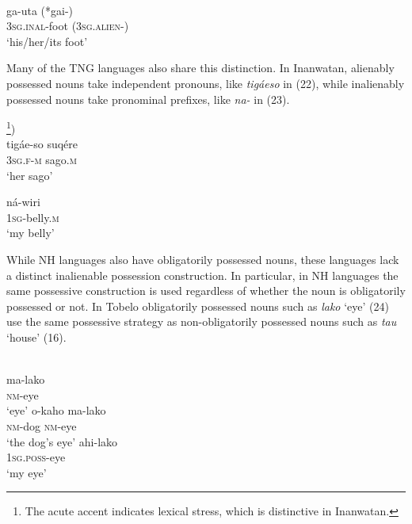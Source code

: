 \ea%
 \\
\gll  ga-uta  (*gai-) \\
  \textsc{3sg.inal}-foot  \textsc{(3sg.alien-)} \\
\glt `his/her/its foot'
\z
 
Many of the TNG languages also share this distinction. In Inanwatan, alienably possessed nouns take independent pronouns, like \textit{tig\'aeso} in (22), while inalienably possessed nouns take pronominal prefixes, like \textit{na- }in (23).

\ea%
\footnote{The acute accent indicates lexical stress, which is distinctive in Inanwatan.})\\
\gll  tig\'ae-so suq\'ere \\
  \textsc{3sg.f}-\textsc{m} sago.\textsc{m} \\
\glt `her sago'
\z





\ea%
\gll  n\'a-wiri \\
 \textsc{1sg}-belly.\textsc{m}  \\
\glt `my belly'
\z





While NH languages also have obligatorily possessed nouns, these languages lack a distinct inalienable possession construction. In particular, in NH languages the same possessive construction is used regardless of whether the noun is obligatorily possessed or not. In Tobelo obligatorily possessed nouns such as \textit{lako }`eye' (24) use the same possessive strategy as non-obligatorily possessed nouns such as \textit{tau }`house' (16).



\ea%
 \\
\ea
  \gll ma-lako \\
    \textsc{nm}-eye  \\
\glt `eye' 
    \ex
    \gll o-kaho ma-lako \\
    \textsc{nm}-dog \textsc{nm}-eye\\
\glt `the dog's eye'
    \ex
    \gll ahi-lako\\
    \textsc{1sg.poss}-eye\\
\glt `my eye'
  \z
\z

